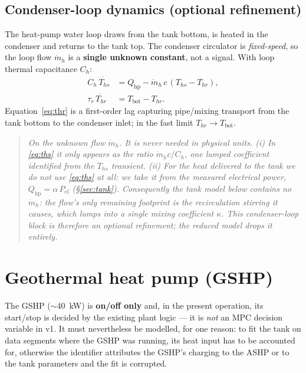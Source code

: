 \documentclass[11pt,a4paper]{article}
\newcommand{\Tbot}{T_{\mathrm{bot}}}
\newcommand{\Ths}{T_{hs}}          %
\newcommand{\Thr}{T_{hr}}          %
\newcommand{\mh}{\dot m_h}         %
\newcommand{\Qhp}{Q_{\mathrm{hp}}}
\newcommand{\Pel}{P_{\mathrm{el}}}
\newcommand{\cw}{c}                %
\begin{document}
\subsection{Condenser-loop dynamics (optional refinement)}
The heat-pump water loop draws from the tank bottom, is heated in the condenser and
returns to the tank top. The condenser circulator is \emph{fixed-speed}, so the loop
flow $\mh$ is a \textbf{single unknown constant}, not a signal. With loop thermal
capacitance $C_h$:
\begin{align}
  C_h\,\dot{\Ths} &= \Qhp - \mh\,\cw\,(\Ths-\Thr), \label{eq:ths}\\
  \tau_r\,\dot{\Thr} &= \Tbot - \Thr. \label{eq:thr}
\end{align}
Equation~\eqref{eq:thr} is a first-order lag capturing pipe/mixing transport from
the tank bottom to the condenser inlet; in the fast limit $\Thr\to\Tbot$.

\begin{quote}\small\itshape
On the unknown flow $\mh$. It is never needed in physical units. (i) In
\eqref{eq:ths} it only appears as the ratio $\mh\cw/C_h$, one lumped coefficient
identified from the $\Ths$ transient. (ii) For the \emph{heat delivered to the
tank} we do not use \eqref{eq:ths} at all: we take it from the measured electrical
power, $\Qhp=\alpha\,\Pel$ (\S\ref{sec:tank}). Consequently the tank model below
contains no $\mh$: the flow's only remaining footprint is the recirculation
\emph{stirring} it causes, which lumps into a single mixing coefficient $\kappa$.
This condenser-loop block is therefore an \emph{optional} refinement; the reduced
model drops it entirely.
\end{quote}

\section{Geothermal heat pump (GSHP)}
\label{sec:gshp}

The GSHP ($\sim$\SI{40}{kW}) is \textbf{on/off only} and, in the present operation,
its start/stop is decided by the existing plant logic --- it is \emph{not} an MPC
decision variable in v1. It must nevertheless be modelled, for one reason: to fit
the tank on data segments where the GSHP was running, its heat input has to be
accounted for, otherwise the identifier attributes the GSHP's charging to the ASHP
or to the tank parameters and the fit is corrupted.
\end{document}
